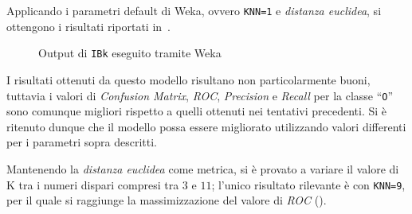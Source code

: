 Applicando i parametri default di Weka, ovvero \texttt{KNN=1} e \emph{distanza euclidea}, si ottengono i risultati riportati in~.

\begin{figure}[H]
  \centering
  \caption{Output di \texttt{IBk} eseguito tramite Weka}%
  \label{fig:ibk:1}
\end{figure}

I risultati ottenuti da questo modello risultano non particolarmente buoni, tuttavia i valori di \emph{Confusion Matrix}, \emph{ROC}, \emph{Precision} e \emph{Recall} per la classe ``\texttt{O}'' sono comunque migliori rispetto a quelli ottenuti nei tentativi precedenti.
Si è ritenuto dunque che il modello possa essere migliorato utilizzando valori differenti per i parametri sopra descritti.

Mantenendo la \emph{distanza euclidea} come metrica, si è provato a variare il valore di K tra i numeri dispari compresi tra \(3\) e \(11\);
l'unico risultato rilevante è con \texttt{KNN=9}, per il quale si raggiunge la massimizzazione del valore di \emph{ROC} ().



